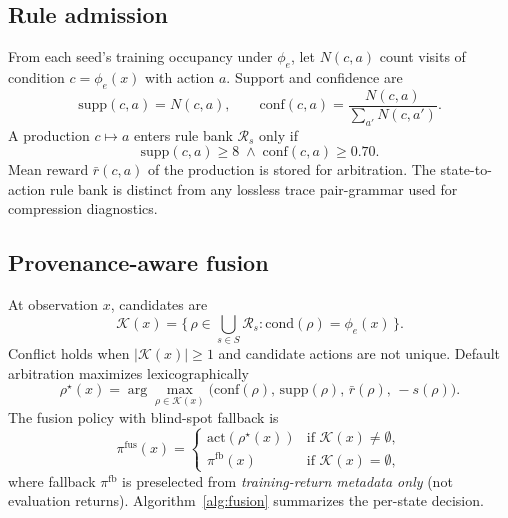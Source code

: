 \documentclass[11pt,a4paper]{article}
\begin{document}
\subsection{Rule admission}
\label{sec:admission}

From each seed's training occupancy under \(\phi_e\), let \(N(c,a)\) count visits of condition \(c=\phi_e(x)\) with action \(a\).
Support and confidence are
\begin{equation}
\label{eq:supp-conf}
\mathrm{supp}(c,a)=N(c,a),\qquad
\mathrm{conf}(c,a)=\frac{N(c,a)}{\sum_{a'}N(c,a')}.
\end{equation}
A production \(c\mapsto a\) enters rule bank \(\mathcal{R}_s\) only if
\begin{equation}
\label{eq:admit}
\mathrm{supp}(c,a)\ge 8
\;\wedge\;
\mathrm{conf}(c,a)\ge 0.70.
\end{equation}
Mean reward \(\bar r(c,a)\) of the production is stored for arbitration.
The state-to-action rule bank is distinct from any lossless trace pair-grammar used for compression diagnostics.

\subsection{Provenance-aware fusion}
\label{sec:fusion}

At observation \(x\), candidates are
\begin{equation}
\label{eq:candidates}
\mathcal{K}(x)
=\{\,\rho\in\textstyle\bigcup_{s\in S}\mathcal{R}_s:
\mathrm{cond}(\rho)=\phi_e(x)\,\}.
\end{equation}
Conflict holds when \(|\mathcal{K}(x)|\ge 1\) and candidate actions are not unique.
Default arbitration maximizes lexicographically
\begin{equation}
\label{eq:arbitrate}
\rho^\star(x)
=\arg\max_{\rho\in\mathcal{K}(x)}
\bigl(\mathrm{conf}(\rho),\,\mathrm{supp}(\rho),\,\bar r(\rho),\,-s(\rho)\bigr).
\end{equation}
The fusion policy with blind-spot fallback is
\begin{equation}
\label{eq:fusion}
\pi^{\mathrm{fus}}(x)=
\begin{cases}
\mathrm{act}(\rho^\star(x)) & \text{if }\mathcal{K}(x)\neq\emptyset,\\[2pt]
\pi^{\mathrm{fb}}(x) & \text{if }\mathcal{K}(x)=\emptyset,
\end{cases}
\end{equation}
where fallback \(\pi^{\mathrm{fb}}\) is preselected from \emph{training-return metadata only} (not evaluation returns).
Algorithm~\ref{alg:fusion} summarizes the per-state decision.
\end{document}

